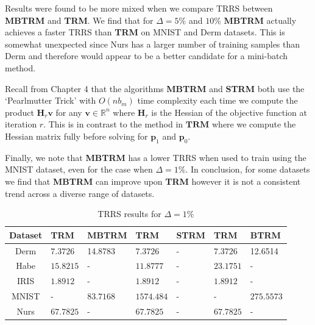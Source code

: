 \documentclass[letterpaper,12pt,titlepage,oneside,final]{book}
\begin{document}
	Results were found to be more mixed when we compare TRRS between \textbf{MBTRM} and \textbf{TRM}. We find that for $\Delta = 5\%$ and $10\%$ \textbf{MBTRM} actually achieves a faster TRRS than \textbf{TRM} on MNIST and Derm datasets. This is somewhat unexpected since Nurs has a larger number of training samples than Derm and therefore would appear to be a better candidate for a mini-batch method. 
	
	Recall from Chapter 4 that the algorithms \textbf{MBTRM} and \textbf{STRM} both use the `Pearlmutter Trick' with $O(nb_{m})$ time complexity each time we compute the product $\mathbf{H}_{r}\mathbf{v}$ for any $\mathbf{v} \in \mathbb{R}^{n}$ where $\mathbf{H}_{r}$ is the Hessian of the objective function at iteration $r$. This is in contrast to the method in $\mathbf{TRM}$ where we compute the Hessian matrix fully before solving for $\mathbf{p}_{1}$ and $\mathbf{p}_{0}$. 
	
	Finally, we note that \textbf{MBTRM} has a lower TRRS when used to train using the MNIST dataset, even for the case when $\Delta = 1\%$. In conclusion, for some datasets we find that \textbf{MBTRM} can improve upon \textbf{TRM} however it is not a consistent trend across a diverse range of datasets.
	
			\begin{table}[h] 
		\centering 
		\begin{tabular}{ |c||l|l||l|l||l|l| } 
			\hline 
			\textbf{Dataset} & \textbf{TRM} & \textbf{MBTRM} & \textbf{TRM} & \textbf{STRM} & \textbf{TRM} & \textbf{BTRM} \\ 
			\hline 
			\hline 
			Derm & $\mathbf{7.3726}$ &14.8783 & $\mathbf{7.3726}$ & - & $\mathbf{7.3726}$ &12.6514\\ 
			\hline 
			Habe & $\mathbf{15.8215}$ & - & $\mathbf{11.8777}$ & - & $\mathbf{23.1751}$ & -\\ 
			\hline 
			IRIS & $\mathbf{1.8912}$ & - & $\mathbf{1.8912}$ & - & $\mathbf{1.8912}$ & -\\ 
			\hline 
			MNIST & - & $\mathbf{83.7168}$ & $\mathbf{1574.484}$ & - & - & $\mathbf{275.5573}$\\ 
			\hline 
			Nurs & $\mathbf{67.7825}$ & - & $\mathbf{67.7825}$ & - & $\mathbf{67.7825}$ & -\\ 
			\hline 
		\end{tabular} 
		\caption{TRRS results for $\Delta = 1\%$} \label{SMBTRMTRM1} \end{table}
	
\end{document}
